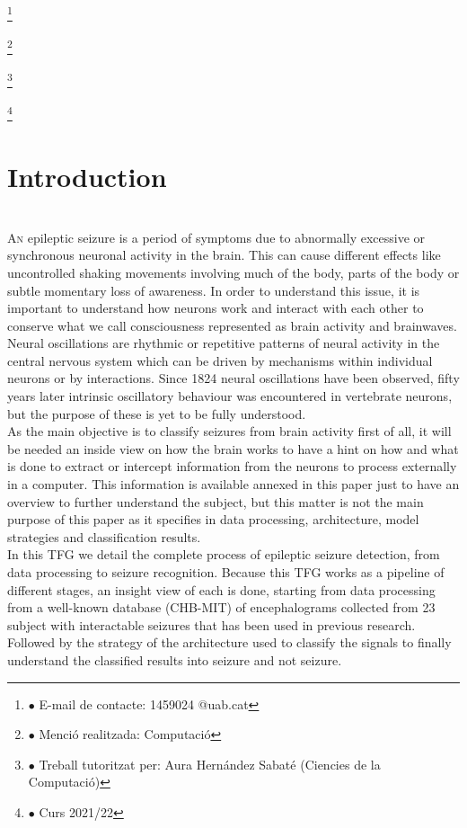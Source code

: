 ﻿\documentclass[10pt,a4paper,twocolumn,twoside]{article}
\newcommand\blfootnote[1]{%
  \begingroup
  \renewcommand\thefootnote{}\footnote{#1}%
  \addtocounter{footnote}{-1}%
  \endgroup
}
\begin{document}
\blfootnote{$\bullet$ E-mail de contacte: 1459024 @uab.cat}
\blfootnote{$\bullet$ Menció realitzada: Computació }
\blfootnote{$\bullet$ Treball tutoritzat per: Aura Hernández Sabaté (Ciencies de la Computació)}
\blfootnote{$\bullet$ Curs 2021/22}

\section{Introduction}
\leavevmode\\
\lettrine[lines=3]{A}{n} epileptic seizure is a period of symptoms due to abnormally excessive or synchronous neuronal activity in the brain. This can cause different effects like uncontrolled shaking movements involving much of the body, parts of the body or subtle momentary loss of awareness. In order to understand this issue, it is important to understand how neurons work and interact with each other to conserve what we call consciousness represented as brain activity and brainwaves. 
\\
Neural oscillations are rhythmic or repetitive patterns of neural activity in the central nervous system which can be driven by mechanisms within individual neurons or by interactions. Since 1824 neural oscillations have been observed, fifty years later intrinsic oscillatory behaviour was encountered in vertebrate neurons, but the purpose of these is yet to be fully understood.
\\
As the main objective is to classify seizures from brain activity first of all, it will be needed an inside view on how the brain works to have a hint on how and what is done to extract or intercept information from the neurons to process externally in a computer. This information is available annexed in this paper just to have an overview to further understand the subject, but this matter is not the main purpose of this paper as it specifies in data processing, architecture, model strategies and classification results.
\\
In this TFG we detail the complete process of epileptic seizure detection, from data processing to seizure recognition. Because this TFG works as a pipeline of different stages, an insight view of each is done, starting from data processing from a well-known database (CHB-MIT) of encephalograms collected from 23 subject with interactable seizures that has been used in previous research. Followed by the strategy of the architecture used to classify the signals to finally understand the classified results into seizure and not seizure.
\end{document}
